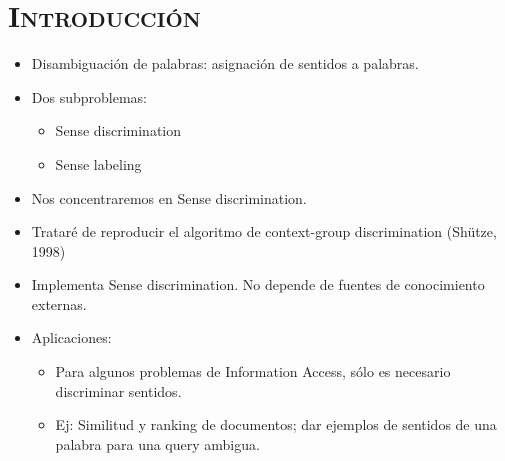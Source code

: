 \documentclass[xcolor=x11names,compress]{beamer}
\renewcommand{\(}{\begin{columns}}
\renewcommand{\)}{\end{columns}}
\newcommand{\<}[1]{\begin{column}{#1}}
\renewcommand{\>}{\end{column}}
\begin{document}
\section{\scshape Introducción}
\begin{frame}
\begin{itemize}
\item Disambiguación de palabras: asignación de sentidos a palabras.
\item Dos subproblemas:
\begin{itemize}
\item Sense discrimination
\item Sense labeling
\end{itemize}
\item Nos concentraremos en Sense discrimination.
\end{itemize}
\end{frame}
\begin{frame}
\begin{itemize}
\item Trataré de reproducir el algoritmo de context-group discrimination (Shütze, 1998)
\item Implementa Sense discrimination. No depende de fuentes de conocimiento externas.
\item Aplicaciones:
\begin{itemize}
\item Para algunos problemas de Information Access, sólo es necesario discriminar sentidos.
\item Ej: Similitud y ranking de documentos; dar ejemplos de sentidos de una palabra para una query ambigua.
\end{itemize}
\end{itemize}
\end{frame}
\end{document}
